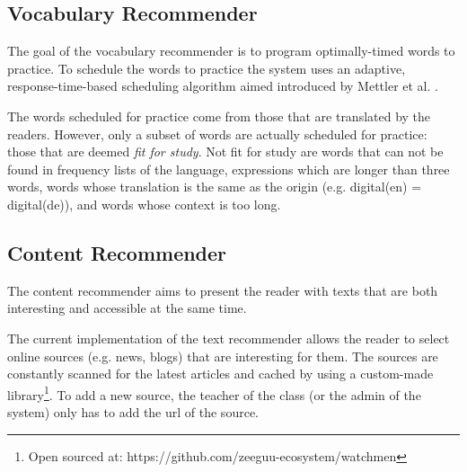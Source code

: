 
\subsection{Vocabulary Recommender}

The goal of the vocabulary recommender is to program optimally-timed words to practice. 
% 
To schedule the words to practice the system uses an adaptive, response-time-based scheduling algorithm aimed introduced by Mettler et al. \cite{Mettler14-ARTS}. 


The words scheduled for practice come from those that are translated by the readers. However, only a subset of words are actually scheduled for practice: those that are deemed {\em fit for study}. Not fit for study are words that can not be found in frequency lists of the language, expressions which are longer than three words, words whose translation is the same as the origin (e.g. digital(en) = digital(de)), and words whose context is too long. 


\subsection{Content Recommender}

The content recommender aims to present the reader with texts that are both interesting and accessible at the same time.

The current implementation of the text recommender allows the reader to select online sources (e.g. news, blogs) that are interesting for them. The sources are constantly scanned for the latest articles and cached by using a custom-made library\footnote{Open sourced at: https://github.com/zeeguu-ecosystem/watchmen}. To add a new source, the teacher of the class (or the admin of the system) only has to add the url of the source.

